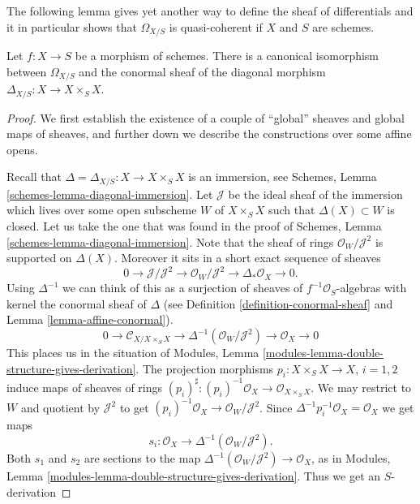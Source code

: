 \noindent
The following lemma gives yet another way to define the sheaf of
differentials and it in particular shows that $\Omega_{X/S}$
is quasi-coherent if $X$ and $S$ are schemes.

\begin{lemma}
\label{lemma-differentials-diagonal}
Let $f : X \to S$ be a morphism of schemes. There is a canonical
isomorphism between $\Omega_{X/S}$ and the conormal sheaf of
the diagonal morphism $\Delta_{X/S} : X \longrightarrow X \times_S X$.
\end{lemma}

\begin{proof}
We first establish the existence of a couple of ``global'' sheaves
and global maps of sheaves, and further down we describe
the constructions over some affine opens.

\medskip\noindent
Recall that $\Delta = \Delta_{X/S} : X \to X \times_S X$
is an immersion, see Schemes, Lemma \ref{schemes-lemma-diagonal-immersion}.
Let $\mathcal{J}$ be the ideal sheaf of the immersion
which lives over some open subscheme $W$ of $X \times_S X$
such that $\Delta(X) \subset W$ is closed. Let us take the one that
was found in the proof of
Schemes, Lemma \ref{schemes-lemma-diagonal-immersion}.
Note that the sheaf of rings $\mathcal{O}_W/\mathcal{J}^2$
is supported on $\Delta(X)$. Moreover it sits in a
short exact sequence of sheaves
$$
0 \to \mathcal{J}/\mathcal{J}^2
\to \mathcal{O}_W/\mathcal{J}^2
\to \Delta_*\mathcal{O}_X
\to 0.
$$
Using $\Delta^{-1}$ we can think of this as a surjection of
sheaves of $f^{-1}\mathcal{O}_S$-algebras with kernel the
conormal sheaf of $\Delta$ (see Definition \ref{definition-conormal-sheaf}
and Lemma \ref{lemma-affine-conormal}).
$$
0 \to \mathcal{C}_{X/X \times_S X}
\to \Delta^{-1}(\mathcal{O}_W/\mathcal{J}^2)
\to \mathcal{O}_X
\to 0
$$
This places us in the situation of
Modules, Lemma \ref{modules-lemma-double-structure-gives-derivation}.
The projection morphisms $p_i : X \times_S X \to X$, $i = 1, 2$ induce
maps of sheaves of rings
$(p_i)^\sharp : (p_i)^{-1}\mathcal{O}_X \to \mathcal{O}_{X \times_S X}$.
We may restrict to $W$ and quotient by $\mathcal{J}^2$ to get
$(p_i)^{-1}\mathcal{O}_X \to \mathcal{O}_W/\mathcal{J}^2$.
Since $\Delta^{-1}p_i^{-1}\mathcal{O}_X = \mathcal{O}_X$
we get maps
$$
s_i : \mathcal{O}_X \to \Delta^{-1}(\mathcal{O}_W/\mathcal{J}^2).
$$
Both $s_1$ and $s_2$ are sections to the map
$\Delta^{-1}(\mathcal{O}_W/\mathcal{J}^2) \to \mathcal{O}_X$,
as in Modules, Lemma \ref{modules-lemma-double-structure-gives-derivation}.
Thus we get an $S$-derivation

\end{proof}

